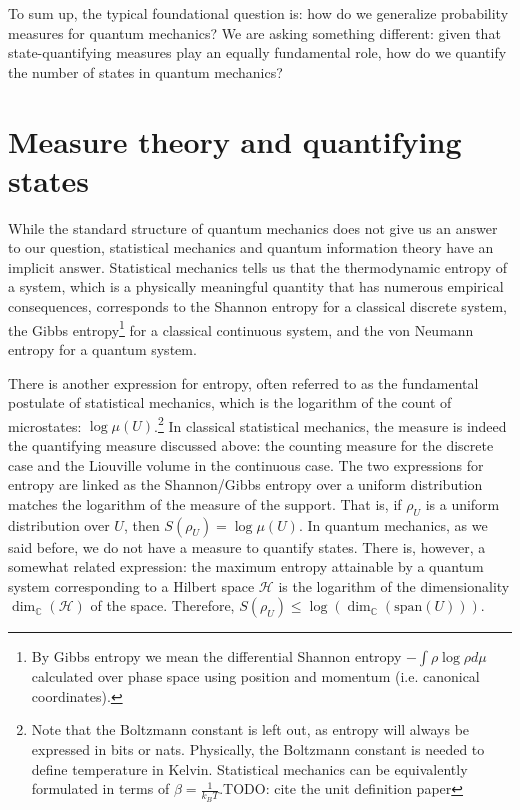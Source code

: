 \documentclass[10pt,twocolumn, nofootinbib]{revtex4-2}
\begin{document}
To sum up, the typical foundational question is: how do we generalize probability measures for quantum mechanics? We are asking something different: given that state-quantifying measures play an equally fundamental role, how do we quantify the number of states in quantum mechanics?

\section{Measure theory and quantifying states}

While the standard structure of quantum mechanics does not give us an answer to our question, statistical mechanics and quantum information theory have an implicit answer. Statistical mechanics tells us that the thermodynamic entropy of a system, which is a physically meaningful quantity that has numerous empirical consequences, corresponds to the Shannon entropy for a classical discrete system, the Gibbs entropy\footnote{By Gibbs entropy we mean the differential Shannon entropy $-\int \rho \log \rho d\mu$ calculated over phase space using position and momentum (i.e. canonical coordinates).} for a classical continuous system, and the von Neumann entropy for a quantum system.

There is another expression for entropy, often referred to as the fundamental postulate of statistical mechanics, which is the logarithm of the count of microstates: $\log \mu(U)$.\footnote{Note that the Boltzmann constant is left out, as entropy will always be expressed in bits or nats. Physically, the Boltzmann constant is needed to define temperature in Kelvin. Statistical mechanics can be equivalently formulated in terms of $\beta = \frac{1}{k_B T}$.TODO: cite the unit definition paper} In classical statistical mechanics, the measure is indeed the quantifying measure discussed above: the counting measure for the discrete case and the Liouville volume in the continuous case. The two expressions for entropy are linked as the Shannon/Gibbs entropy over a uniform distribution matches the logarithm of the measure of the support. That is, if $\rho_U$ is a uniform distribution over $U$, then $S(\rho_U) = \log \mu(U)$. In quantum mechanics, as we said before, we do not have a measure to quantify states. There is, however, a somewhat related expression: the maximum entropy attainable by a quantum system corresponding to a Hilbert space $\mathcal{H}$ is the logarithm of the dimensionality $\dim_{\mathbb{C}}(\mathcal{H})$ of the space. Therefore, $ S(\rho_U) \leq \log (\dim_{\mathbb{C}}(\text{span}(U)))$.
\end{document}
